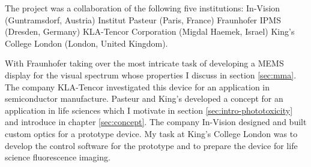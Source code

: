 \documentclass[oneside,a4paper,12pt,BCOR20mm,DIV14]{scrbook} %
\begin{document}
The project was a collaboration of the following five institutions:
In-Vision (Guntramsdorf, Austria) Institut Pasteur (Paris, France)
Fraunhofer IPMS (Dresden, Germany) KLA-Tencor Corporation (Migdal
Haemek, Israel) King's College London (London, United Kingdom).

With Fraunhofer taking over the most intricate task of developing a
MEMS display for the visual spectrum whose properties I discuss in
section \ref{sec:mma}. The company KLA-Tencor investigated this device
for an application in semiconductor manufacture. Pasteur and King's
developed a concept for an application in life sciences which I
motivate in section \ref{sec:intro-phototoxicity} and introduce in
chapter \ref{sec:concept}. The company In-Vision designed and built
custom optics for a prototype device. My task at King's College London
was to develop the control software for the prototype and to prepare
the device for life science fluorescence imaging.
\end{document}
